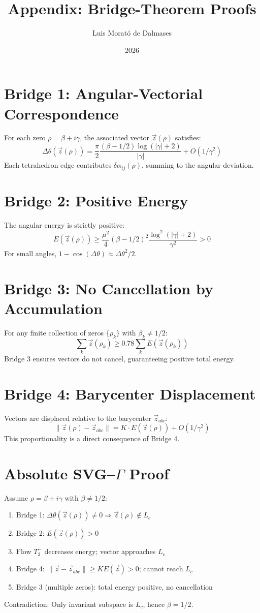 \documentclass[12pt]{article}
\title{Appendix: Bridge-Theorem Proofs}
\author{Luis Morató de Dalmases}
\date{2026}
\begin{document}
\maketitle

\section{Bridge 1: Angular-Vectorial Correspondence}
For each zero $\rho = \beta + i\gamma$, the associated vector $\vec{z}(\rho)$ satisfies:
\[
\Delta\theta(\vec{z}(\rho)) = \frac{\pi}{2} \frac{(\beta - 1/2) \log(|\gamma|+2)}{|\gamma|} + O(1/\gamma^2)
\]
Each tetrahedron edge contributes $\delta\alpha_{ij}(\rho)$, summing to the angular deviation.

\section{Bridge 2: Positive Energy}
The angular energy is strictly positive:
\[
E(\vec{z}(\rho)) \ge \frac{\mu^2}{4} (\beta-1/2)^2 \frac{\log^2(|\gamma|+2)}{\gamma^2} > 0
\]
For small angles, $1 - \cos(\Delta\theta) \approx \Delta\theta^2/2$.

\section{Bridge 3: No Cancellation by Accumulation}
For any finite collection of zeros $\{\rho_k\}$ with $\beta_k \neq 1/2$:
\[
\sum_k \vec{z}(\rho_k) \ge 0.78 \sum_k E(\vec{z}(\rho_k))
\]
Bridge 3 ensures vectors do not cancel, guaranteeing positive total energy.

\section{Bridge 4: Barycenter Displacement}
Vectors are displaced relative to the barycenter $\vec{z}_{abc}$:
\[
\|\vec{z}(\rho) - \vec{z}_{abc}\| = K \cdot E(\vec{z}(\rho)) + O(1/\gamma^2)
\]
This proportionality is a direct consequence of Bridge 4.

\section{Absolute SVG--$\Gamma$ Proof}
Assume $\rho = \beta + i\gamma$ with $\beta \neq 1/2$:
\begin{enumerate}
    \item Bridge 1: $\Delta\theta(\vec{z}(\rho)) \neq 0 \Rightarrow \vec{z}(\rho) \notin L_c$
    \item Bridge 2: $E(\vec{z}(\rho))>0$
    \item Flow $T_3^-$ decreases energy; vector approaches $L_c$
    \item Bridge 4: $\|\vec{z}-\vec{z}_{abc}\| \ge K E(\vec{z}) >0$; cannot reach $L_c$
    \item Bridge 3 (multiple zeros): total energy positive, no cancellation
\end{enumerate}
Contradiction: Only invariant subspace is $L_c$, hence $\beta = 1/2$.
\end{document}
